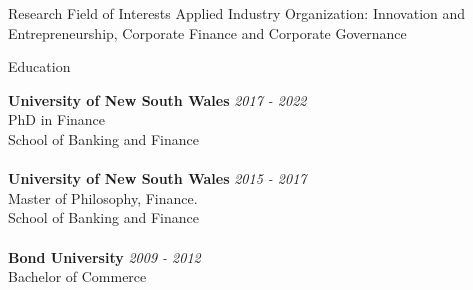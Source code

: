 \documentclass{resume} %
\begin{document}

\begin{rSection}{Research Field of Interests}
	Applied Industry Organization: Innovation and Entrepreneurship, Corporate Finance and Corporate Governance

\end{rSection}
\begin{rSection}{Education}

	{\bf University of New South Wales} \hfill {\em 2017 - 2022}
	\\ PhD in Finance
	\\ School of Banking and Finance\\
	\\{\bf University of New South Wales} \hfill {\em 2015 - 2017}
	\\ Master of Philosophy, Finance.
	\\ School of Banking and Finance
	\\
	\\{\bf Bond University} \hfill {\em 2009 - 2012}
	\\ Bachelor of Commerce
\end{rSection}
\end{document}
